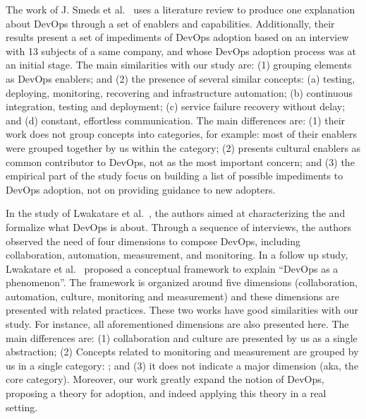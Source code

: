 The work of J. Smeds et al.~\cite{devops_a_definition_xp_15} uses a literature
review to produce one explanation about DevOps through a set of enablers and capabilities. Additionally, their results
present a set of impediments of DevOps adoption based on an interview with 13
subjects of a same company, and whose DevOps adoption process was at
an initial stage. The main similarities with our study are: (1) grouping
elements as DevOps enablers; and (2) the presence of several similar concepts:
(a) testing, deploying, monitoring, recovering and infrastructure automation;
(b) continuous integration, testing and deployment; (c) service failure recovery
without delay; and (d) constant, effortless communication. The main
differences are: (1) their work does not group concepts into categories,
for example: most of their enablers were grouped together by us within the  category; (2) presents cultural enablers as
common contributor to DevOps, not as the most important concern; and (3) the empirical
part of the study focus on building a list of possible impediments to DevOps
adoption, not on providing guidance to new adopters.


In the study of Lwakatare et al.~\cite{dimensions_of_devops_xp_15}, the
authors aimed at characterizing the and formalize what DevOps is about. Through
a sequence of interviews, the authors observed the need of four dimensions to compose
DevOps, including collaboration, automation, measurement, and monitoring.
In a follow up study,
Lwakatare et al.~\cite{extending_dimensions_icsea_16} proposed a conceptual
framework to explain ``DevOps as a phenomenon''. The framework is organized around
five dimensions (collaboration, automation, culture, monitoring and measurement)
and these dimensions are presented with related practices.
These two works have good similarities with our study. For instance,
all aforementioned dimensions are also presented here. The
main differences are: (1) collaboration and culture are presented by us
as a single abstraction; (2) Concepts related to monitoring and measurement are
grouped by us in a single category: ; and (3) it does
not indicate a major dimension (aka, the core category).
Moreover, our work greatly expand the notion of DevOps, proposing a theory
for adoption, and indeed applying this theory in a real setting.

